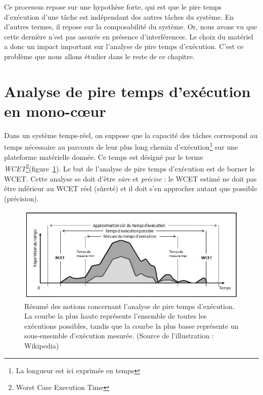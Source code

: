 Ce processus repose sur une hypothèse forte, qui est que le pire temps d'exécution d'une tâche est indépendant des autres tâches du système.
En d'autres termes, il repose sur la composabilité du système. Or, nous avons vu que cette dernière n'est pas assurée en présence d'interférences.
Le choix du matériel a donc un impact important sur l'analyse de pire temps d'exécution.
C'est ce problème que nous allons étudier dans le reste de ce chapitre.

\section{Analyse de pire temps d'exécution en mono-cœur}

Dans un système temps-réel, on suppose que la capacité des tâches correspond au temps nécessaire au parcours de leur plus long chemin d'exécution\footnote{La longueur est ici exprimée en temps} sur une plateforme matérielle donnée.
Ce temps est désigné par le terme \emph{WCET}\footnote{Worst Case Execution Time}(figure~\ref{fig:terminologie_wcet}).
Le but de l'analyse de pire temps d'exécution est de borner le WCET.
Cette analyse se doit d'être \emph{sûre} et \emph{précise} : le WCET estimé ne doit pas être inférieur au WCET réel (sûreté) et il doit s'en approcher autant que possible (précision).


\begin{figure}[!h]
	\centering
	\includegraphics[width=\linewidth]{graphics/figures/termes_wcet.jpg}
	\caption{\label{fig:terminologie_wcet}
	Résumé des notions concernant l'analyse de pire temps d'exécution.
	La courbe la plus haute représente l'ensemble de toutes les exécutions possibles, tandis que la courbe la plus basse représente un sous-ensemble d'exécution mesurée.
	 (Source de l'illustration : Wikipedia)}
\end{figure}

